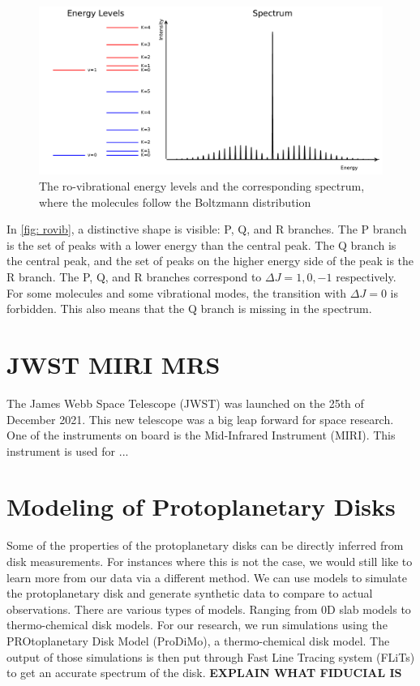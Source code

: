 \documentclass[twoside, single, authoryear, semicolon, 12pt]{lion-msc}
\newcommand{\4}{$_4$}
\newcommand{\3}{$_3$}
\newcommand{\2}{$_2$}
\begin{document}
\begin{figure}[!ht]
    \centering
    \includegraphics[width=\linewidth]{Figures/RoVibSpectrum.pdf}
    \caption{The ro-vibrational energy levels and the corresponding spectrum, where the molecules follow the Boltzmann distribution}
    \label{fig: rovib}
\end{figure}

In \autoref{fig: rovib}, a distinctive shape is visible: P, Q, and R branches. The P branch is the set of peaks with a lower energy than the central peak. The Q branch is the central peak, and the set of peaks on the higher energy side of the peak is the R branch. The P, Q, and R branches correspond to $\Delta J=1, 0, -1$ respectively. For some molecules and some vibrational modes, the transition with $\Delta J=0$ is forbidden. This also means that the Q branch is missing in the spectrum.

\section{JWST MIRI MRS}
The James Webb Space Telescope (JWST) was launched on the 25th of December 2021. This new telescope was a big leap forward for space research. One of the instruments on board is the Mid-Infrared Instrument (MIRI). This instrument is used for ...

\section{Modeling of Protoplanetary Disks}
Some of the properties of the protoplanetary disks can be directly inferred from disk measurements. For instances where this is not the case, we would still like to learn more from our data via a different method. We can use models to simulate the protoplanetary disk and generate synthetic data to compare to actual observations. There are various types of models. Ranging from 0D slab models to thermo-chemical disk models. For our research, we run simulations using the PROtoplanetary Disk Model (ProDiMo), a thermo-chemical disk model. The output of those simulations is then put through Fast Line Tracing system (FLiTs) to get an accurate spectrum of the disk. 
\textbf{EXPLAIN WHAT FIDUCIAL IS}
\end{document}
